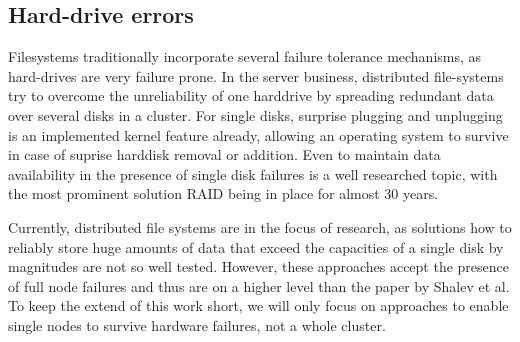 \documentclass[a4paper,10pt,twoside]{article}
\begin{document}
\subsection{Hard-drive errors}
Filesystems traditionally incorporate several failure tolerance mechanisms, as hard-drives are very failure prone. In the server business, distributed file-systems try to overcome the unreliability of one harddrive by spreading redundant data over several disks in a cluster. For single disks, surprise plugging and unplugging is an implemented kernel feature already, allowing an operating system to survive in case of suprise harddisk removal or addition. %
Even to maintain data availability in the presence of single disk failures is a well researched topic, with the most prominent solution RAID \cite{RAID} being in place for almost 30 years.

Currently, distributed file systems are in the focus of research, as solutions how to reliably store huge amounts of data that exceed the capacities of a single disk by magnitudes are not so well tested. However, these approaches accept the presence of full node failures and thus are on a higher level than the paper by Shalev et al. To keep the extend of this work short, we will only focus on approaches to enable single nodes to survive hardware failures, not a whole cluster.
\end{document}

